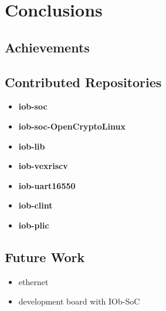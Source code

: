 \chapter{Conclusions}
\label{chapter:conclusions}

\section{Achievements}
\label{section:achievements}

\section{Contributed Repositories}
\label{section:contributions}
\begin{itemize}
    \item \textbf{iob-soc}
    \item \textbf{iob-soc-OpenCryptoLinux}
    \item \textbf{iob-lib}
    \item \textbf{iob-vexriscv}
    \item \textbf{iob-uart16550}
    \item \textbf{iob-clint}
    \item \textbf{iob-plic}
\end{itemize}

\section{Future Work}
\label{section:future}
\begin{itemize}
    \item ethernet
    \item development board with IOb-SoC
\end{itemize}
